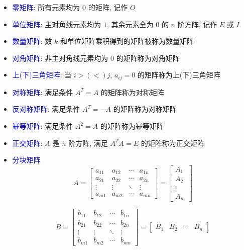 \begin{definition}[重要矩阵]
	\begin{itemize}
		\item \textcolor{blue}{零矩阵}: 所有元素均为 $0$ 的矩阵, 记作 $O$
		\item \textcolor{blue}{单位矩阵}: 主对角线元素均为 $1$, 其余元素全为 $0$ 的 $n$ 阶方阵, 记作 $E$ 或 $I$
		\item \textcolor{blue}{数量矩阵}: 数 $k$ 和单位矩阵乘积得到的矩阵被称为数量矩阵
		\item \textcolor{blue}{对角矩阵}: 非主对角线元素均为 $0$ 的矩阵称为对角矩阵
		\item \textcolor{blue}{上(下)三角矩阵}: 当 $i>(<)j$, $a_{ij}=0$ 的矩阵称为上(下)三角矩阵
		\item \textcolor{blue}{对称矩阵}: 满足条件 $A^{T}=A$ 的矩阵称为对称矩阵
		\item \textcolor{blue}{反对称矩阵}: 满足条件 $A^{T}=-A$ 的矩阵称为对称矩阵
		\item \textcolor{blue}{幂等矩阵}: 满足条件 $A^{2}=A$ 的矩阵称为幂等矩阵
		\item \textcolor{blue}{正交矩阵}: $A$ 是 $n$ 阶方阵, 满足 $A^{T}A=E$ 的矩阵称为正交矩阵
		\item \textcolor{blue}{分块矩阵}
		$$A = \begin{bmatrix}
			a_{11} & a_{12} & \cdots & a_{1n}\\
			a_{21} & a_{22} & \cdots & a_{2n}\\
			\vdots & \vdots & \ddots & \vdots\\
			a_{m1} & a_{m2} & \cdots & a_{mn}
		\end{bmatrix} = 
		\begin{bmatrix}
			A_{1}\\
			A_{2}\\
			\vdots\\
			A_{m}
		\end{bmatrix}$$

		$$B = \begin{bmatrix}
			b_{11} & b_{12} & \cdots & b_{1n}\\
			b_{21} & b_{22} & \cdots & b_{2n}\\
			\vdots & \vdots & \ddots & \vdots\\
			b_{m1} & b_{m2} & \cdots & b_{mn}
		\end{bmatrix} = 
		\begin{bmatrix}
			B_{1} & B_{2} & \cdots & B_{n}
		\end{bmatrix}$$


\end{itemize}
\end{definition}
